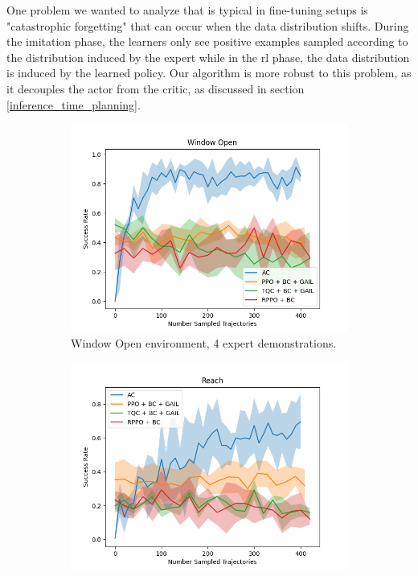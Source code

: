 One problem we wanted to analyze that is typical in fine-tuning setups 
is "catastrophic forgetting" 
that can occur when the data distribution shifts. During the imitation phase, the learners only see positive examples sampled according to 
the distribution induced by the expert while in the \ac{rl} phase, the data distribution is induced by the learned policy.
Our algorithm is more robust to this problem, as it 
decouples the actor from the critic, as discussed in section \ref{inference_time_planning}.\\ 

\begin{figure}[htbp]
  \centering
  \begin{subfigure}[t]{0.45\textwidth}
    \includegraphics[width=\textwidth]{images/FineTuning/Window Open.png}
    \caption{Window Open environment, 4 expert demonstrations.}
    \label{fig:plot3}
  \end{subfigure}
  \begin{subfigure}[t]{0.45\textwidth}
    \includegraphics[width=\textwidth]{images/FineTuning/Reach.png}

\end{subfigure}
\end{figure}

